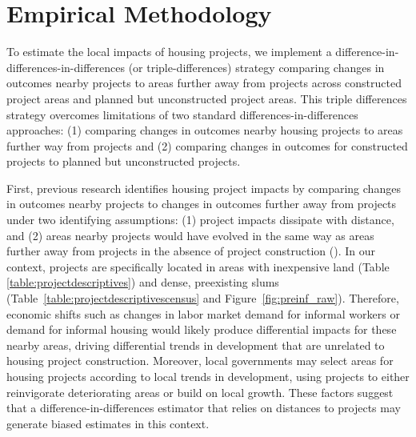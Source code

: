 \documentclass[12pt]{article}
\begin{document}
\section{Empirical Methodology}\label{section:methodology}


To estimate the local impacts of housing projects, we implement a difference-in-differences-in-differences (or triple-differences) strategy comparing changes in outcomes nearby projects to areas further away from projects across constructed project areas and planned but unconstructed project areas.  This triple differences strategy overcomes limitations of two standard differences-in-differences approaches: (1) comparing changes in outcomes nearby housing projects to areas further way from projects and (2) comparing changes in outcomes for constructed projects to planned but unconstructed projects.

First, previous research identifies housing project impacts by comparing changes in outcomes nearby projects to changes in outcomes further away from projects under two identifying assumptions: (1) project impacts dissipate with distance, and (2) areas nearby projects would have evolved in the same way as areas further away from projects in the absence of project construction (\cite{diamond2016wants,harari2018slum}).  In our context, projects are specifically located in areas with inexpensive land (Table \ref{table:projectdescriptives}) and dense, preexisting slums (Table~\ref{table:projectdescriptivescensus} and Figure~\ref{fig:preinf_raw}).  Therefore, economic shifts such as changes in labor market demand for informal workers or demand for informal housing would likely produce differential impacts for these nearby areas, driving differential trends in development that are unrelated to housing project construction.  Moreover, local governments may select areas for housing projects according to local trends in development, using projects to either reinvigorate deteriorating areas or build on local growth.  These factors suggest that a difference-in-differences estimator that relies on distances to projects may generate biased estimates in this context.
\end{document}
